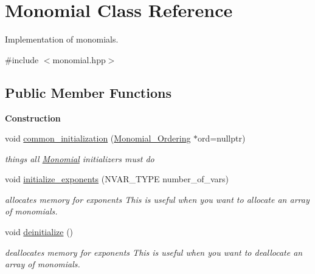 \hypertarget{class_monomial}{}\section{Monomial Class Reference}
\label{class_monomial}


Implementation of monomials.  




{\ttfamily \#include $<$monomial.\+hpp$>$}

\subsection*{Public Member Functions}
\begin{Indent}\textbf{ Construction}\par
\begin{DoxyCompactItemize}
\item 
\mbox{\label{class_monomial_a701983a4a655c00e551a35087de88895}} 
void \hyperlink{class_monomial_a701983a4a655c00e551a35087de88895}{common\+\_\+initialization} (\hyperlink{class_monomial___ordering}{Monomial\+\_\+\+Ordering} $\ast$ord=nullptr)
\begin{DoxyCompactList}\small\item\em things all {\ttfamily \hyperlink{class_monomial}{Monomial}} initializers must do \end{DoxyCompactList}\item 
\mbox{\label{class_monomial_a1103a9a7e8d60147a1e00a1bd23bfea3}} 
void \hyperlink{class_monomial_a1103a9a7e8d60147a1e00a1bd23bfea3}{initialize\+\_\+exponents} (N\+V\+A\+R\+\_\+\+T\+Y\+PE number\+\_\+of\+\_\+vars)
\begin{DoxyCompactList}\small\item\em allocates memory for exponents This is useful when you want to allocate an array of monomials. \end{DoxyCompactList}\item 
\mbox{\label{class_monomial_a471eab4cf0ce40225a1b8210513ad9e4}} 
void \hyperlink{class_monomial_a471eab4cf0ce40225a1b8210513ad9e4}{deinitialize} ()
\begin{DoxyCompactList}\small\item\em deallocates memory for exponents This is useful when you want to deallocate an array of monomials. \end{DoxyCompactList}\item 

\end{DoxyCompactItemize}
\end{Indent}
